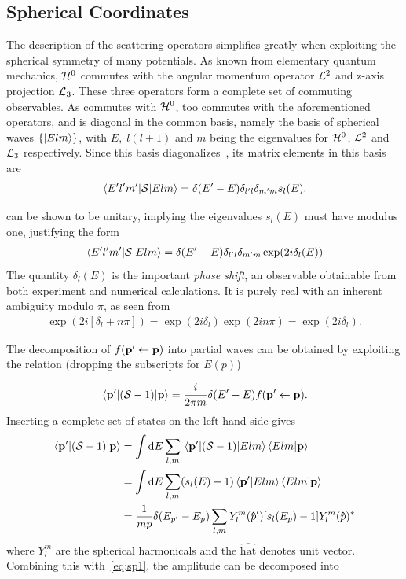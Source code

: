 \subsection{Spherical Coordinates}
The description of the scattering operators simplifies greatly when exploiting
the spherical symmetry of many potentials.
As known from elementary quantum mechanics, \(\mathcal{H}^{0}\) commutes with the
angular momentum operator \(\mathcal{L}^{2}\) and z-axis projection \(\mathcal{L}_{3}\).
These three operators form a complete set of commuting observables. As 
\mscat{} commutes with \(\mathcal{H}^{0}\), \mscat{} too commutes with the
aforementioned 
operators, and is diagonal in the common basis, namely the basis of spherical waves
\(\left\{ \ket{Elm} \right\}\), with \(E,\; l(l+1)\) and \(m\) being the
eigenvalues for \(\mathcal{H}^{0}\),  \(\mathcal{L}^{2}\) and  \(\mathcal{L}_{3}\)
respectively. Since this basis diagonalizes\ \mscat{}, its matrix elements in
this basis are
\begin{align*}
  \mel{E^{\prime}l^{\prime}m^{\prime}}{\mathcal{S}}{Elm} = \delta(E^{\prime}-E)\delta_{l^{\prime}l}\delta_{m^{\prime}m}s_{l}(E).
\end{align*}

\mscat{} can be shown to be unitary, implying the eigenvalues \(s_{l}(E)\) must have
modulus one, justifying the form
\begin{align*}
  \mel{E^{\prime}l^{\prime}m^{\prime}}{\mathcal{S}}{Elm} = \delta(E^{\prime}-E)\delta_{l^{\prime}l}\delta_{m^{\prime}m}\exp(2i\delta_{l}(E))
\end{align*}
The quantity \(\delta_{l}(E)\) is the important \textit{phase shift}, an
observable obtainable from both experiment and numerical calculations. It is
purely real with an inherent ambiguity modulo \(\pi\), as seen from
\begin{align*}
  \exp(2i[\delta_{l}+n\pi]) = \exp(2i\delta_{l})\exp(2in\pi) = \exp(2i\delta_{l}).
\end{align*}

The decomposition of \(f(\vb{p}^{\prime}\leftarrow\vb{p})\) into partial waves
can be obtained by exploiting the relation (dropping the subscripts for \(E(p)\))

\begin{equation}
  \label{eq:sp1}
  \mel{\vb{p}^{\prime}}{(\mathcal{S}-1)}{\vb{p}} = \frac{i}{2\pi m}\delta(E^{\prime}-E)f(\vb{p}^{\prime}\leftarrow \vb{p}).
\end{equation}
Inserting a complete set of states on the left hand side gives
\begin{align*}
  \mel{\vb{p}^{\prime}}{(\scat-1)}{\vb{p}} &= \int \dd E \sum_{l, m}  \mel{\vb{p}^{\prime}}{(\scat-1)}{Elm}\ip{Elm}{\vb{p}}\\
                                             &=  \int \dd E \sum_{l, m} (s_{l}(E)-1) \ip{\vb{p}^{\prime}}{Elm}\ip{Elm}{\vb{p}}\\
  &= \frac{1}{mp}\delta(E_{p^{\prime}}-E_{p})\sum_{l,m}Y_{l}^{m}(\vu{p}^{\prime})[s_{l}(E_{p})-1]Y^{m}_{l}(\vu{p})^{*}
\end{align*}
where \(Y_{l}^{m}\) are the spherical harmonicals and the \(\hat{\text{hat}}\) denotes unit vector. Combining this
with~\eqref{eq:sp1}, the amplitude can be decomposed into

